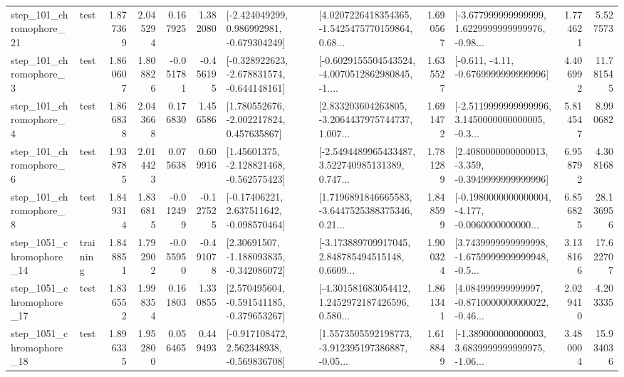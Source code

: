 \begin{tabular}{llrrrrllrlrr}
  step\_101\_chromophore\_21 &      test &      1.877369 &    2.045294 &      0.167925 &  1.382080 &   [-2.424049299, 0.986992981, -0.679304249] &  [4.0207226418354365, -1.5425475770159864, 0.68... &       1.690567 &  [-3.677999999999999, 1.6229999999999976, -0.98... &            1.774621 &          5.527573 \\
   step\_101\_chromophore\_3 &      test &      1.860607 &    1.808826 &     -0.051781 & -0.456195 &  [-0.328922623, -2.678831574, -0.644148161] &  [-0.6029155504543524, -4.0070512862980845, -1.... &       1.635527 &               [-0.611, -4.11, -0.6769999999999996] &            4.406992 &         11.781545 \\
   step\_101\_chromophore\_4 &      test &      1.866838 &    2.043668 &      0.176830 &  1.456586 &    [1.780552676, -2.002217824, 0.457635867] &  [2.833203604263805, -3.2064437975744737, 1.007... &       1.691472 &  [-2.5119999999999996, 3.1450000000000005, -0.3... &            5.814547 &          8.990682 \\
   step\_101\_chromophore\_6 &      test &      1.938785 &    2.014423 &      0.075638 &  0.609916 &    [1.45601375, -2.128821468, -0.562575423] &  [-2.5494489965433487, 3.522740985131389, 0.747... &       1.781289 &  [2.4080000000000013, -3.359, -0.3949999999999996] &            6.958792 &          4.308168 \\
   step\_101\_chromophore\_8 &      test &      1.849314 &    1.836815 &     -0.012499 & -0.127525 &    [-0.17406221, 2.637511642, -0.098570464] &  [1.7196891846665583, -3.6447525388375346, 0.21... &       1.848599 &  [-0.1980000000000004, -4.177, -0.0060000000000... &            6.856825 &         28.136956 \\
 step\_1051\_chromophore\_14 &  training &      1.848851 &    1.792902 &     -0.055950 & -0.491078 &    [2.30691507, -1.188093835, -0.342086072] &  [-3.173889709917045, 2.848785494515148, 0.6609... &       1.900324 &  [3.7439999999999998, -1.6759999999999948, -0.5... &            3.138166 &         17.622707 \\
 step\_1051\_chromophore\_17 &      test &      1.836552 &    1.998354 &      0.161803 &  1.330855 &   [2.570495604, -0.591541185, -0.379653267] &  [-4.301581683054412, 1.2452972187426596, 0.580... &       1.861341 &  [4.084999999999997, -0.8710000000000022, -0.46... &            2.029410 &          4.203335 \\
 step\_1051\_chromophore\_18 &      test &      1.896335 &    1.952800 &      0.056465 &  0.449493 &   [-0.917108472, 2.562348938, -0.569836708] &  [1.5573505592198773, -3.912395197386887, -0.05... &       1.618849 &  [-1.389000000000003, 3.6839999999999975, -1.06... &            3.480004 &         15.934036 \\

\end{tabular}
